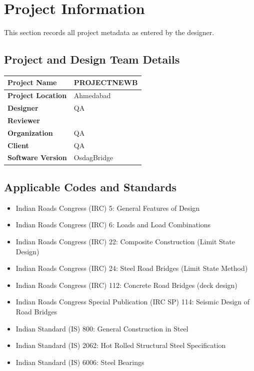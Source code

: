 \documentclass[12pt,a4paper]{report}
\numberwithin{table}{chapter}
\numberwithin{figure}{chapter}
\begin{document}
\titleformat{\chapter}[block]{\normalfont\Large\bfseries\centering}{\thechapter}{1em}{}
\titlespacing*{\chapter}{0pt}{-30pt}{10pt}


\chapter{Project Information}

This section records all project metadata as entered by the designer.

\section{Project and Design Team Details}
\label{sec:project-details}

\begin{tabular}{|L{5.5cm}|L{8.5cm}|}
\hline
\textbf{Project Name} & PROJECTNEWB \\
\hline
\textbf{Project Location} & Ahmedabad \\
\hline
\textbf{Designer} & QA \\
\hline
\textbf{Reviewer} &  \\
\hline
\textbf{Organization} & QA \\
\hline
\textbf{Client} & QA \\
\hline
\textbf{Software Version} & OsdagBridge \\
\hline
\end{tabular}


\section{Applicable Codes and Standards}
\label{sec:codes}

\begin{itemize}
\item Indian Roads Congress (IRC) 5: General Features of Design
\item Indian Roads Congress (IRC) 6: Loads and Load Combinations
\item Indian Roads Congress (IRC) 22: Composite Construction (Limit State Design)
\item Indian Roads Congress (IRC) 24: Steel Road Bridges (Limit State Method)
\item Indian Roads Congress (IRC) 112: Concrete Road Bridges (deck design)
\item Indian Roads Congress Special Publication (IRC SP) 114: Seismic Design of Road Bridges
\item Indian Standard (IS) 800: General Construction in Steel
\item Indian Standard (IS) 2062: Hot Rolled Structural Steel Specification
\item Indian Standard (IS) 6006: Steel Bearings
\end{itemize}
\end{document}
